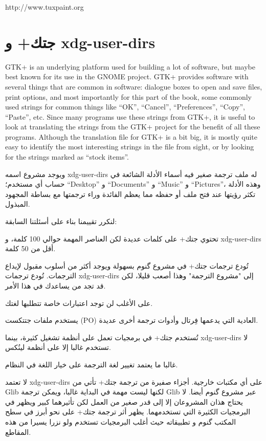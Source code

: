http://www.tuxpaint.org

\section{جتك+ و xdg-user-dirs}
GTK+ is an underlying platform used for building a lot of software, but
maybe best known for its use in the GNOME project. GTK+ provides
software with several things that are common in software: dialogue
boxes to open and save files, print options, and most importantly for
this part of the book, some commonly used strings for common things
like “OK”, “Cancel”, “Preferences”, “Copy”, “Paste”, etc. Since many
programs use these strings from GTK+, it is useful to look at
translating the strings from the GTK+ project for the benefit of all
these programs. Although the translation file for GTK+ is a bit big, it
is mostly quite easy to identify the most interesting strings in the
file from sight, or by looking for the strings marked as “stock items”.

ويوجد مشروع اسمه xdg-user-dirs له ملف ترجمة صغير فيه أسماء الأدلة
الشائعة في حساب أي مستخدم؛ “Desktop” و “Documents” و “Music” و
“Pictures”، وهذه الأدلة تكثر رؤيتها عند فتح ملف أو حفظه مما يعظم
الفائدة وراء ترجمتها مع بساطة المجهود المبذول.

لنكرر تقييمنا بناء على أسئلتنا السابقة:

\startitemize[1]
\item تحتوي جتك+ على كلمات عديدة لكن العناصر المهمة حوالي 100 كلمة، و
xdg-user-dirs أقل من 50 كلمة.
\item تُودع ترجمات جتك+ في مشروع گنوم بسهولة ويوجد أكثر من أسلوب مقبول
لإيداع الترجمات. تُودع ترجمات xdg-user-dirs إلى "مشروع الترجمة" وهذا
أصعب قليلا، لكن قد تجد من يساعدك في هذا الأمر.
\item على الأغلب لن توجد اعتبارات خاصة تتطلبها لغتك.
\stopitemize
\startitemize[1]
\item يستخدم ملفات جتتكست (PO) العادية التي يدعمها فِرتال وأدوات ترجمة
أخرى عديدة.
\item تُستخدم جتك+ في برمجيات تعمل على أنظمة تشغيل كثيرة، بينما
xdg-user-dirs لا تستخدم غالبا إلا على أنظمة لينُكس.
\item غالبا ما يعتمد تغيير لغة الترجمة على خيار اللغة في النظام.
\item لا تعتمد xdg-user-dirs على أي مكتبات خارجية. أجزاء صفيرة من ترجمة
جتك+ تأتي من Glib لكنها ليست مهمة في البداية غالبا، ويمكن ترجمة Glib
عبر مشروع گنوم أيضا.
\stopitemize
لا يحتاج هذان المشروعان إلا إلى قدر صغير من العمل لكن تأثيرهما كبير
ويظهر في البرمجيات الكثيرة التي تستخدمهما. يظهر أثر ترجمة جتك+ على نحو
أبرز في سطح المكتب گنوم و تطبيقاته حيث أغلب البرمجيات تستخدم ولو نزرا
يسيرا من هذه المقاطع.

